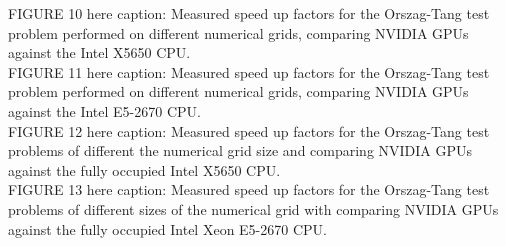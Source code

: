 \documentclass[final,1p]{elsarticle}
\begin{document}




FIGURE 10 here caption: Measured speed up factors for the Orszag-Tang test problem performed on different numerical grids, comparing NVIDIA GPUs against the Intel X5650 CPU.\\




FIGURE 11 here caption: Measured speed up factors for the Orszag-Tang test problem performed on different numerical grids, comparing NVIDIA GPUs against the Intel E5-2670 CPU.\\








  

FIGURE 12 here caption: Measured speed up factors for the Orszag-Tang test problems of different the numerical grid size and  comparing NVIDIA GPUs against the fully occupied Intel X5650 CPU.\\


FIGURE 13 here caption: Measured speed up factors for the Orszag-Tang test problems of different sizes of the numerical grid with comparing NVIDIA GPUs against the fully occupied Intel Xeon E5-2670  CPU.\\
\end{document}
